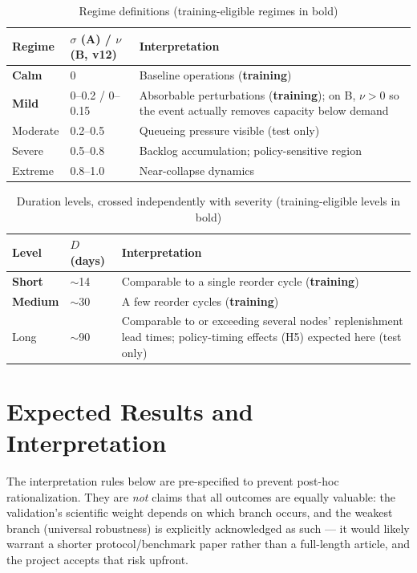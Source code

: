 \documentclass[12pt,a4paper]{article}
\begin{document}
\begin{table}[H]
\centering
\caption{Regime definitions (training-eligible regimes in bold)}
\label{tab:regimes}
\footnotesize
\begin{tabular}{llp{8.2cm}}
\toprule
\textbf{Regime} & $\sigma$ (A) / $\nu$ (B, v12) & \textbf{Interpretation} \\
\midrule
\textbf{Calm} & 0 & Baseline operations (\textbf{training}) \\
\textbf{Mild} & 0--0.2 / 0--0.15 & Absorbable perturbations (\textbf{training}); on B, $\nu>0$ so the event actually removes capacity below demand \\
Moderate & 0.2--0.5 & Queueing pressure visible (test only) \\
Severe & 0.5--0.8 & Backlog accumulation; policy-sensitive region \\
Extreme & 0.8--1.0 & Near-collapse dynamics \\
\bottomrule
\end{tabular}
\end{table}

\begin{table}[H]
\centering
\caption{Duration levels, crossed independently with severity (training-eligible levels in bold)}
\label{tab:duration}
\footnotesize
\begin{tabular}{llp{8.2cm}}
\toprule
\textbf{Level} & $D$ (days) & \textbf{Interpretation} \\
\midrule
\textbf{Short} & $\sim$14 & Comparable to a single reorder cycle (\textbf{training}) \\
\textbf{Medium} & $\sim$30 & A few reorder cycles (\textbf{training}) \\
Long & $\sim$90 & Comparable to or exceeding several nodes' replenishment lead times; policy-timing effects (H5) expected here (test only) \\
\bottomrule
\end{tabular}
\end{table}

\section{Expected Results and Interpretation}\label{sec:results}

The interpretation rules below are pre-specified to prevent post-hoc rationalization. They are \emph{not} claims that all outcomes are equally valuable: the validation's scientific weight depends on which branch occurs, and the weakest branch (universal robustness) is explicitly acknowledged as such --- it would likely warrant a shorter protocol/benchmark paper rather than a full-length article, and the project accepts that risk upfront.
\end{document}
